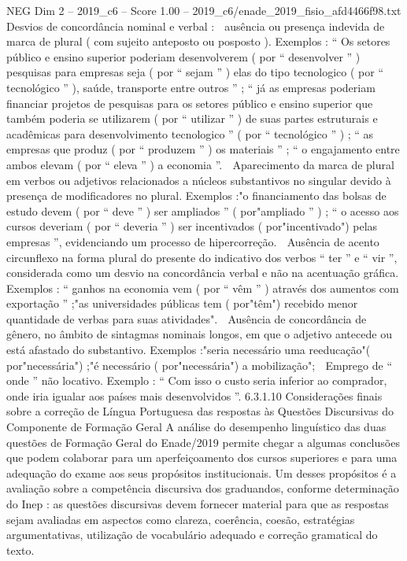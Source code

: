 \begin{textsample}{NEG Dim 2 – 2019\_c6 – Score 1.00 – 2019\_c6/enade\_2019\_fisio\_afd4466f98.txt}
Desvios de concordância nominal e verbal :  ausência ou presença indevida de marca de plural ( com sujeito anteposto ou posposto ).
Exemplos : “ Os setores público e ensino superior poderiam desenvolverem ( por “ desenvolver ” ) pesquisas para empresas seja ( por “ sejam ” ) elas do tipo tecnologico ( por “ tecnológico ” ), saúde, transporte entre outros ” ; “ já as empresas poderiam financiar projetos de pesquisas para os setores público e ensino superior que também poderia se utilizarem ( por “ utilizar ” ) de suas partes estruturais e acadêmicas para desenvolvimento tecnologico ” ( por “ tecnológico ” ) ; “ as empresas que produz ( por “ produzem ” ) os materiais ” ; “ o engajamento entre ambos elevam ( por “ eleva ” ) a economia ”.  Aparecimento da marca de plural em verbos ou adjetivos relacionados a núcleos substantivos no singular devido à presença de modificadores no plural.
Exemplos :"o financiamento das bolsas de estudo devem ( por “ deve ” ) ser ampliados ” ( por"ampliado ” ) ; “ o acesso aos cursos deveriam ( por “ deveria ” ) ser incentivados ( por"incentivado") pelas empresas ”, evidenciando um processo de hipercorreção.  Ausência de acento circunflexo na forma plural do presente do indicativo dos verbos “ ter ” e “ vir ”, considerada como um desvio na concordância verbal e não na acentuação gráfica.
Exemplos : “ ganhos na economia vem ( por “ vêm ” ) através dos aumentos com exportação ” ;"as universidades públicas tem ( por"têm") recebido menor quantidade de verbas para suas atividades".  Ausência de concordância de gênero, no âmbito de sintagmas nominais longos, em que o adjetivo antecede ou está afastado do substantivo.
Exemplos :"seria necessário uma reeducação"( por"necessária") ;"é necessário ( por"necessária") a mobilização";  Emprego de “ onde ” não locativo.
Exemplo : “ Com isso o custo seria inferior ao comprador, onde iria igualar aos países mais desenvolvidos ”. 6.3.1.10 Considerações finais sobre a correção de Língua Portuguesa das respostas às Questões Discursivas do Componente de Formação Geral A análise do desempenho linguístico das duas questões de Formação Geral do Enade/2019 permite chegar a algumas conclusões que podem colaborar para um aperfeiçoamento dos cursos superiores e para uma adequação do exame aos seus propósitos institucionais.
Um desses propósitos é a avaliação sobre a competência discursiva dos graduandos, conforme determinação do Inep : as questões discursivas devem fornecer material para que as respostas sejam avaliadas em aspectos como clareza, coerência, coesão, estratégias argumentativas, utilização de vocabulário adequado e correção gramatical do texto.

\end{textsample}
